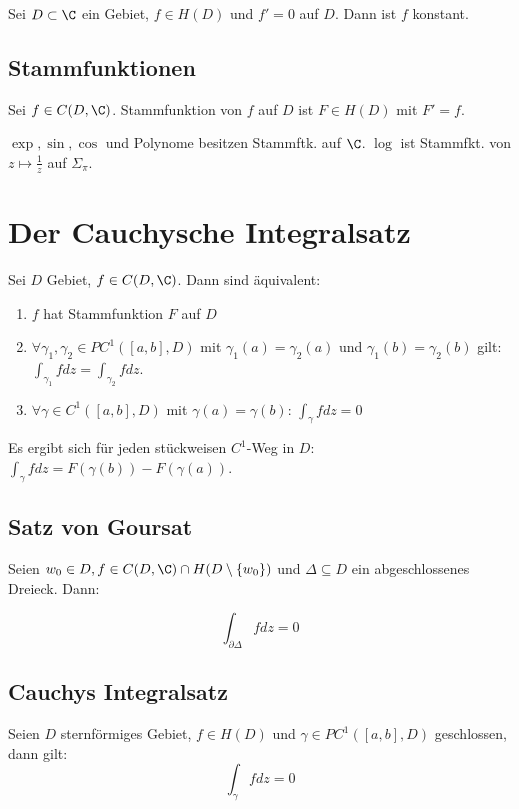 Sei \(D \subset \C\) ein Gebiet, \(f \in H(D)\) und \(f'=0\) auf \(D\). Dann ist \(f\) konstant.

\subsection*{Stammfunktionen}

Sei \(f \in C(D,\C)\). Stammfunktion von \(f\) auf \(D\) ist \(F \in H(D)\) mit \(F'=f\).

\(\exp, \sin, \cos\) und Polynome besitzen Stammftk. auf \(\C\). \(\log\) ist Stammfkt. von \(z \mapsto \frac{1}{z}\) auf \(\Sigma_\pi\).

\section*{Der Cauchysche Integralsatz}

Sei \(D\) Gebiet, \(f \in C(D,\C)\). Dann sind äquivalent:

\begin{enumerate}[label=(\alph*)]
	\item \(f\) hat Stammfunktion \(F\) auf \(D\)
	\item \(\forall \gamma_1, \gamma_2 \in PC^1([a,b],D)\) mit \(\gamma_1(a)=\gamma_2(a)\) und \(\gamma_1(b)=\gamma_2(b)\) gilt: \(\int_{\gamma_1} f dz = \int_{\gamma_2} f dz\).
	\item \(\forall \gamma \in C^1([a,b],D)\) mit \(\gamma(a)=\gamma(b)\): \(\int_\gamma f dz = 0\)
\end{enumerate}

Es ergibt sich für jeden stückweisen \(C^1\)-Weg in \(D\): \(\int_\gamma f dz = F(\gamma(b)) - F(\gamma(a))\).

\subsection*{Satz von Goursat}

Seien \(w_0 \in D, f \in C(D,\C) \cap H(D \setminus \{w_0\})\) und \(\Delta \subseteq D\) ein abgeschlossenes Dreieck. Dann:

\vspace*{-2mm}
\[ \int_{\partial\Delta} f dz = 0 \]

\subsection*{Cauchys Integralsatz}

Seien \(D\) sternförmiges Gebiet, \(f \in H(D)\) und \(\gamma \in PC^1([a,b],D)\) geschlossen, dann gilt: \[ \int_\gamma f dz = 0 \]

